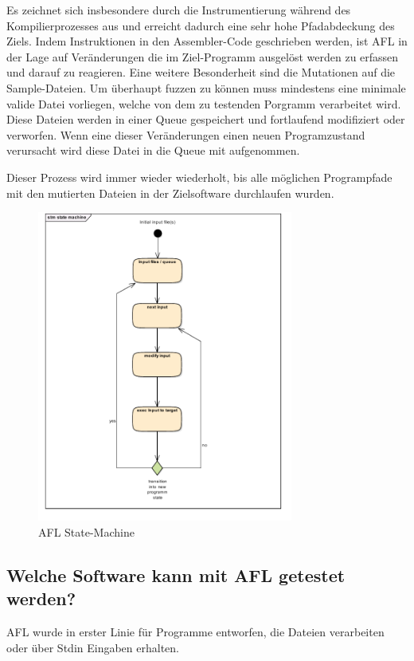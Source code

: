 \documentclass[12pt,a4paper]{scrreprt}
\begin{document}
Es zeichnet sich insbesondere durch die Instrumentierung während des Kompilierprozesses aus und erreicht dadurch eine sehr hohe Pfadabdeckung des Ziels. Indem Instruktionen in den Assembler-Code geschrieben werden, ist AFL in der Lage auf Veränderungen die im Ziel-Programm ausgelöst werden zu erfassen und darauf zu reagieren.
Eine weitere Besonderheit sind die Mutationen auf die Sample-Dateien. Um überhaupt fuzzen zu können muss mindestens eine minimale valide Datei vorliegen, welche von dem zu testenden Porgramm verarbeitet wird. Diese Dateien werden in einer Queue gespeichert und fortlaufend modifiziert oder verworfen. Wenn eine dieser Veränderungen einen neuen Programzustand verursacht wird diese Datei in die Queue mit aufgenommen.

Dieser Prozess wird immer wieder wiederholt, bis alle möglichen Programpfade mit den mutierten Dateien in der Zielsoftware durchlaufen wurden.



\begin{figure}[htbp] 
  \centering
     \includegraphics[width=0.75\textwidth]{state_machine.png}
  \caption{AFL State-Machine}
  \label{fig:Bild0}
\end{figure}




\subsection{Welche Software kann mit AFL getestet werden?}
AFL wurde in erster Linie für Programme entworfen, die Dateien verarbeiten oder über Stdin Eingaben erhalten. 
\end{document}
